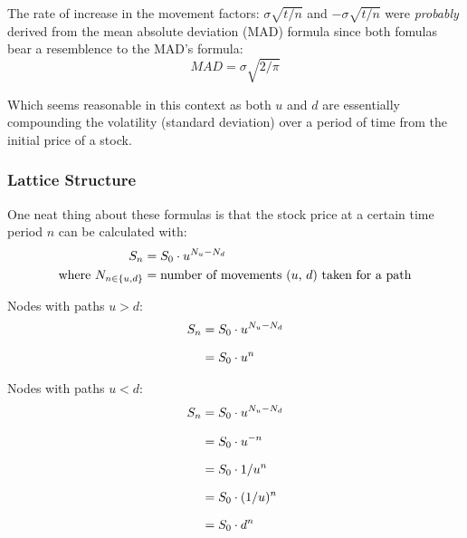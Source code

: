 \documentclass[12pt, letterpaper]{article}\usepackage{float}
\begin{document}
\medskip

The rate of increase in the movement factors: ${\sigma\sqrt{t/n}}$ and ${-\sigma\sqrt{t/n}}$ were \textit{probably} derived from the mean absolute deviation (MAD) formula since both fomulas bear a resemblence to the MAD's formula\cite{madwikipedia}:
\begin{equation*}
  MAD = \sigma\sqrt{2/\pi}
\end{equation*}

\noindent Which seems reasonable in this context as both ${u}$ and ${d}$ are essentially compounding the volatility (standard deviation) over a period of time from the initial price of a stock.

\bigskip

\subsubsection*{Lattice Structure}

One neat thing about these formulas is that the stock price at a certain time period ${n}$ can be calculated with:
\begin{align*}
  \centering
  S_n &= S_0 \cdot u^{N_u-N_d} \\
  \text{where}~N_{n \in \{u,d\}} &= \text{number of movements (${u}$, ${d}$) taken for a path}
\end{align*}

\bigskip

Nodes with paths ${u > d}$:
\begin{equation*}
  \setlength{\jot}{10pt}
  \begin{split}
    {S}_n
    & = {S}_0 \cdot {u}^{N_u-N_d} \\
    & = {S}_0 \cdot {u}^n
  \end{split}
\end{equation*}

\bigskip

Nodes with paths ${u < d}$:
\begin{equation*}
  \setlength{\jot}{10pt}
  \begin{split}
    {S}_n
    & = {S}_0 \cdot {u}^{N_u-N_d} \\
    & = {S}_0 \cdot {u^{-n}} \\
    & = {S}_0 \cdot {1/u^n} \\
    & = {S}_0 \cdot ({1/u})^n \\
    & = {S}_0 \cdot {d^n}
  \end{split}
\end{equation*}
\end{document}
